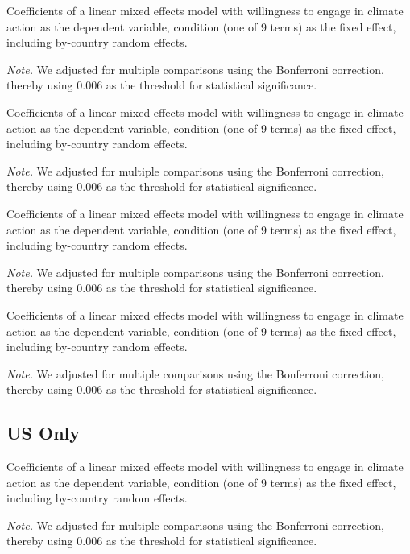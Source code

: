 \begin{table}[H] 
\caption{Coefficients of a linear mixed effects model with willingness to engage in climate action as the dependent variable, condition (one of 9 terms) as the fixed effect, including by-country random effects.}
 
\end{table}
\textit{Note.} We adjusted for multiple comparisons using the Bonferroni correction, thereby using 0.006 as the threshold for statistical significance.

\begin{table}[H] 
\caption{Coefficients of a linear mixed effects model with willingness to engage in climate action as the dependent variable, condition (one of 9 terms) as the fixed effect, including by-country random effects.}
 
\end{table}
\textit{Note.} We adjusted for multiple comparisons using the Bonferroni correction, thereby using 0.006 as the threshold for statistical significance.

\begin{table}[H] 
\caption{Coefficients of a linear mixed effects model with willingness to engage in climate action as the dependent variable, condition (one of 9 terms) as the fixed effect, including by-country random effects.}
 
\end{table}
\textit{Note.} We adjusted for multiple comparisons using the Bonferroni correction, thereby using 0.006 as the threshold for statistical significance.

\begin{table}[H] 
\caption{Coefficients of a linear mixed effects model with willingness to engage in climate action as the dependent variable, condition (one of 9 terms) as the fixed effect, including by-country random effects.}
 
\end{table}
\textit{Note.} We adjusted for multiple comparisons using the Bonferroni correction, thereby using 0.006 as the threshold for statistical significance.

   \subsection{US Only}

\begin{table}[H] 
\caption{Coefficients of a linear mixed effects model with willingness to engage in climate action as the dependent variable, condition (one of 9 terms) as the fixed effect, including by-country random effects.}
 
\end{table}
\textit{Note.} We adjusted for multiple comparisons using the Bonferroni correction, thereby using 0.006 as the threshold for statistical significance.

